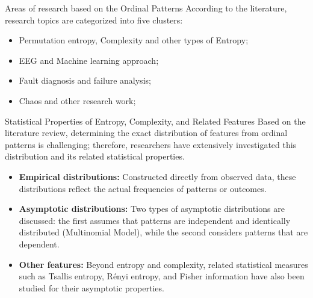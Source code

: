 \documentclass{beamer}
\begin{document}
\begin{frame}{Areas of research based on the Ordinal Patterns}
	According to the literature, research topics are categorized into five clusters:
	
	\begin{itemize}
		\item Permutation entropy, Complexity and other types of Entropy;
		\item EEG and Machine learning approach;
		\item Fault diagnosis and failure analysis;
		\item Chaos and other research work;
	\end{itemize}
\end{frame}

\begin{frame}{Statistical Properties of Entropy, Complexity, and Related Features}
	Based on the literature review, determining the exact distribution of \alert{features} from ordinal patterns is challenging; therefore, researchers have extensively investigated this distribution and its related statistical properties.
	\begin{itemize}
		\item \textbf{Empirical distributions:} Constructed directly from observed data, these distributions reflect the actual frequencies of patterns or outcomes.
		\item \textbf{Asymptotic distributions:} Two types of asymptotic distributions are discussed: the first assumes that patterns are independent and identically distributed (Multinomial Model), while the second considers patterns that are dependent.
		\item \textbf{Other features:} Beyond entropy and complexity, related statistical measures such as Tsallis entropy, Rényi entropy, and Fisher information have also been studied for their asymptotic properties.
	\end{itemize}
\end{frame}


\end{document}
